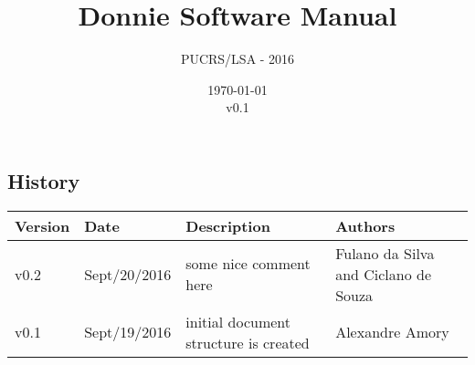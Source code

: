\documentclass[11pt,a4paper,final]{report}
\author{PUCRS/LSA - 2016}
\title{Donnie Software Manual}
\date{\today\\v0.1}
\begin{document}
\pagestyle{empty}

\maketitle 







\begin{landscape}
\chapter{History}
\label{sec:history}

\thispagestyle{empty}

\begin{tabular}{p{1.5cm}p{3cm}p{12cm}p{6cm}}
	\toprule
	 \textbf{Version} & \textbf{Date} & \textbf{Description}  & \textbf{Authors}\\
	\midrule
v0.2 & Sept/20/2016 & some nice comment here & Fulano da Silva and Ciclano de Souza  \\
v0.1 & Sept/19/2016 & initial document structure is created & Alexandre Amory  \\
	\bottomrule
\end{tabular}

\end{landscape}
\end{document}
